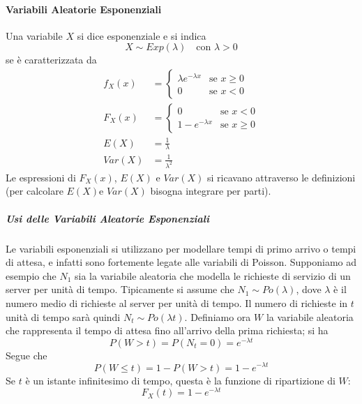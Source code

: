 \documentclass{article}
\theoremstyle{plain}
\theoremstyle{definition}
\theoremstyle{remark}
\begin{document}
\paragraph{Variabili Aleatorie Esponenziali} %
\label{par:variabili_aleatorie_esponenziali}
Una variabile $X$ si dice esponenziale e si indica
\begin{equation*}
	X\sim Exp(\lambda)\quad\text{con }\lambda>0
\end{equation*}
se è caratterizzata da
\begin{align*}
	f_X(x)&=
	\begin{cases}
		\lambda e^{-\lambda x}&\text{se }x\geq0\\
		0&\text{se }x<0
	\end{cases}\\
	F_X(x)&=
	\begin{cases}
		0&\text{se }x<0\\
		1-e^{-\lambda x}&\text{se }x\geq0
	\end{cases}\\
	E(X)&=\frac{1}{\lambda}\\
	Var(X)&=\frac{1}{\lambda^2}
\end{align*}
Le espressioni di $F_X(x)$, $E(X)$ e $Var(X)$ si ricavano attraverso le definizioni (per calcolare $E(X)$e $Var(X)$ bisogna integrare per parti).
\subparagraph{Usi delle Variabili Aleatorie Esponenziali} %
\label{subp:usi_delle_variabili_aleatorie_esponenziali}
Le variabili esponenziali si utilizzano per modellare tempi di primo arrivo o tempi di attesa, e infatti sono fortemente legate alle variabili di Poisson. Supponiamo ad esempio che $N_1$ sia la variabile aleatoria che modella le richieste di servizio di un server per unità di tempo. Tipicamente si assume che $N_1\sim Po(\lambda)$, dove $\lambda$ è il numero medio di richieste al server per unità di tempo. Il numero di richieste in $t$ unità di tempo sarà quindi $N_t\sim Po(\lambda t)$. Definiamo ora $W$ la variabile aleatoria che rappresenta il tempo di attesa fino all'arrivo della prima richiesta; si ha
\begin{equation*}
	P(W>t)=P(N_t=0)=e^{-\lambda t}
\end{equation*}
Segue che
\begin{equation*}
	P(W\leq t)=1-P(W>t)=1-e^{-\lambda t}
\end{equation*}
Se $t$ è un istante infinitesimo di tempo, questa è la funzione di ripartizione di $W$:
\begin{equation*}
	F_X(t)=1-e^{-\lambda t}
\end{equation*}
\end{document}
